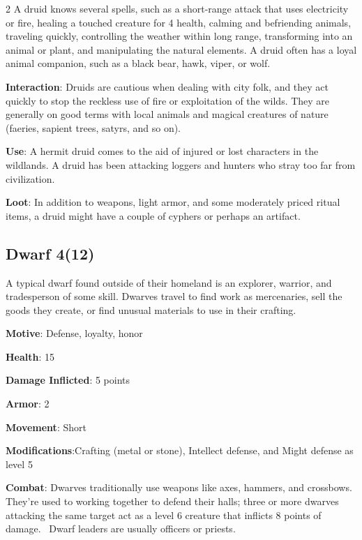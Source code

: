 \begin{multicols}{2}
A druid knows several spells, such as a short-range attack that uses electricity or fire, healing a touched creature for 4 health, calming and befriending animals, traveling quickly, controlling the weather within long range, transforming into an animal or plant, and manipulating the natural elements. A druid often has a loyal animal companion, such as a black bear, hawk, viper, or wolf. 

\textbf{Interaction}: Druids are cautious when dealing with city folk, and they act quickly to stop the reckless use of fire or exploitation of the wilds. They are generally on good terms with local animals and magical creatures of nature (faeries, sapient trees, satyrs, and so on). 

\textbf{Use}: A hermit druid comes to the aid of injured or lost characters in the wildlands. A druid has been attacking loggers and hunters who stray too far from civilization. 

\textbf{Loot}: In addition to weapons, light armor, and some moderately priced ritual items, a druid might have a couple of cyphers or perhaps an artifact.

\subsection{Dwarf 4(12)}

A typical dwarf found outside of their homeland is an explorer, warrior, and tradesperson of some skill. Dwarves travel to find work as mercenaries, sell the goods they create, or find unusual materials to use in their crafting. 

\textbf{Motive}: Defense, loyalty, honor 

\textbf{Health}: 15 

\textbf{Damage Inflicted}: 5 points 

\textbf{Armor}: 2 

\textbf{Movement}: Short 

\textbf{Modifications}:Crafting (metal or stone), Intellect defense, and Might defense as level 5 

\textbf{Combat}: Dwarves traditionally use weapons like axes, hammers, and crossbows. They’re used to working together to defend their halls; three or more dwarves attacking the same target act as a level 6 creature that inflicts 8 points of damage. 
Dwarf leaders are usually officers or priests.


\end{multicols}
